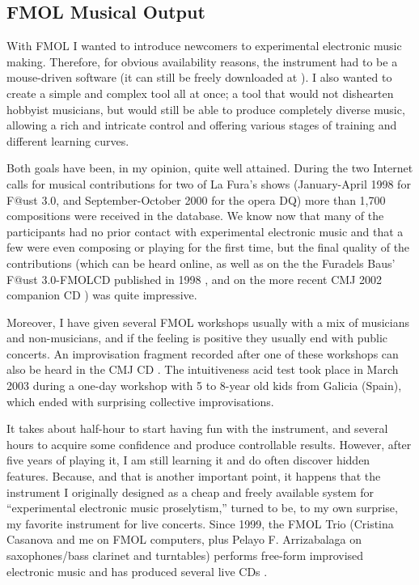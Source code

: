 \subsection{FMOL Musical Output}

With FMOL I wanted to introduce newcomers to experimental electronic music
making. Therefore, for obvious availability reasons,  the instrument  had to be a
mouse-driven software (it can still be  freely  downloaded  at  \cite{Jorda:2002}).  I  also
wanted to create a simple and complex tool  all at once; a tool that would not
dishearten hobbyist musicians, but would still be able to produce completely
diverse music, allowing a rich and intricate control  and  offering  various 
stages of training and different learning curves.

Both goals have been, in my opinion, quite well attained. During the two
Internet calls for musical contributions  for two of La Fura's shows
(January-April 1998 for F@ust 3.0, and September-October 2000  for the opera DQ)
more than  1,700 compositions were received in the database. We know now
that many of the participants had no prior contact with experimental electronic
music and that a few were even composing or playing for the first time, but the
final quality of the contributions (which can be heard online, as well as on the
the Furadels Baus' F@ust 3.0-FMOLCD published in 1998 \cite{Jorda:1999}, and on the more
recent CMJ 2002 companion CD \cite{CMJ:2002}) was quite impressive.

Moreover, I have given several  FMOL workshops  usually with a mix of
musicians and non-musicians,  and if the feeling is positive they usually end
with public concerts. An improvisation fragment recorded after one of these
workshops can also be heard in the CMJ CD \cite{CMJ:2002}. The intuitiveness acid test took place in
March 2003 during a one-day workshop with 5 to 8-year old kids from Galicia
(Spain), which ended with surprising collective  improvisations.

It takes about half-hour to start having fun with the instrument, and several
hours  to acquire some confidence and produce controllable results. However,
after five years of playing it, I am still  learning it and do often discover
hidden features.  Because,  and  that  is  another  important  point,  it
happens that the instrument I originally designed as  a cheap and freely
available system for ``experimental electronic music proselytism,'' turned to be,
to my own surprise, my favorite instrument for live concerts. Since 1999, the
FMOL Trio (Cristina Casanova and me on FMOL computers, plus Pelayo F.
Arrizabalaga on saxophones/bass clarinet and turntables) performs free-form
improvised electronic music and has produced several live CDs \cite{Feller:2002,Trio:2000,Trio:2002,Trio:2002a}.


